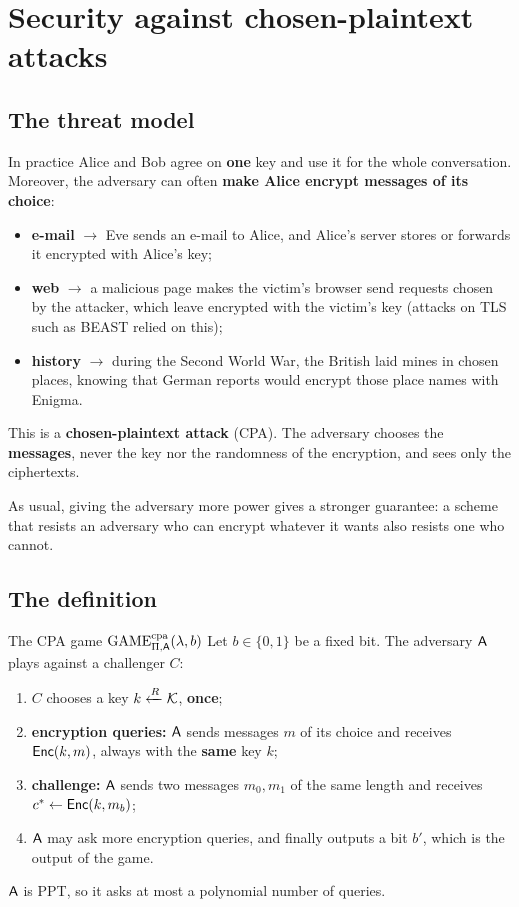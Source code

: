 
\section{Security against chosen-plaintext attacks}

\subsection{The threat model}

In practice Alice and Bob agree on \textbf{one} key and use it for the whole conversation. Moreover, the adversary can often \textbf{make Alice encrypt messages of its choice}:
\begin{itemize}
  \item \textbf{e-mail} $\to$ Eve sends an e-mail to Alice, and Alice's server stores or forwards it encrypted with Alice's key;
  \item \textbf{web} $\to$ a malicious page makes the victim's browser send requests chosen by the attacker, which leave encrypted with the victim's key (attacks on TLS such as BEAST relied on this);
  \item \textbf{history} $\to$ during the Second World War, the British laid mines in chosen places, knowing that German reports would encrypt those place names with Enigma.
\end{itemize}
This is a \textbf{chosen-plaintext attack} (CPA). The adversary chooses the \textbf{messages}, never the key nor the randomness of the encryption, and sees only the ciphertexts.

As usual, giving the adversary more power gives a stronger guarantee: a scheme that resists an adversary who can encrypt whatever it wants also resists one who cannot.

\subsection{The definition}

\begin{frameddefn}[label={def:cpa-game}]{The CPA game $\mathrm{GAME}^{\text{cpa}}_{\Pi,\mathsf{A}}(\lambda, b)$}
  Let $b \in \{0,1\}$ be a fixed bit. The adversary $\mathsf{A}$ plays against a challenger $C$:
  \begin{enumerate}
    \item $C$ chooses a key $k \xleftarrow{R} \mathcal{K}$, \textbf{once};
    \item \textbf{encryption queries:} $\mathsf{A}$ sends messages $m$ of its choice and receives $\mathsf{Enc}(k, m)$, always with the \textbf{same} key $k$;
    \item \textbf{challenge:} $\mathsf{A}$ sends two messages $m_0, m_1$ of the same length and receives $c^* \leftarrow \mathsf{Enc}(k, m_b)$;
    \item $\mathsf{A}$ may ask more encryption queries, and finally outputs a bit $b'$, which is the output of the game.
  \end{enumerate}
  $\mathsf{A}$ is PPT, so it asks at most a polynomial number of queries.
\end{frameddefn}

